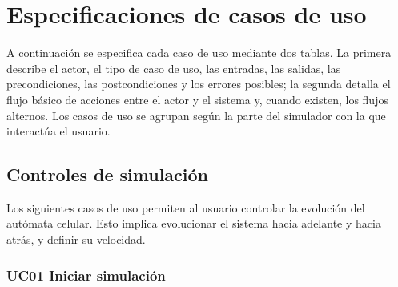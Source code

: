 \section{Especificaciones de casos de uso}
\label{sec:especificaciones}

A continuación se especifica cada caso de uso mediante dos tablas. La primera describe el actor, el tipo de caso de uso, las entradas, las salidas, las precondiciones, las postcondiciones y los errores posibles; la segunda detalla el flujo básico de acciones entre el actor y el sistema y, cuando existen, los flujos alternos. Los casos de uso se agrupan según la parte del simulador con la que interactúa el usuario.

\subsection{Controles de simulación}

Los siguientes casos de uso permiten al usuario controlar la evolución del autómata celular. Esto implica evolucionar el sistema hacia adelante y hacia atrás, y definir su velocidad.

\subsubsection*{UC01 Iniciar simulación}

